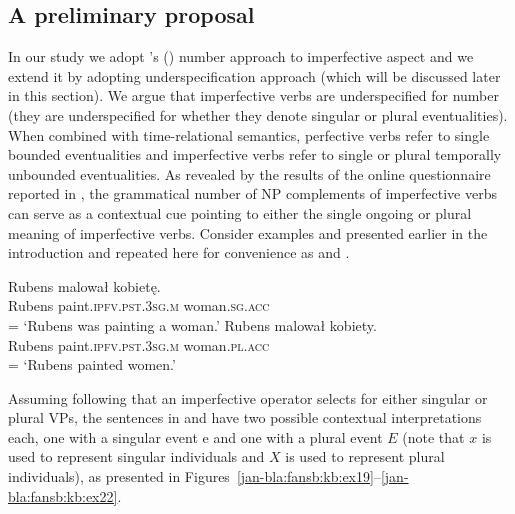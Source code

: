 \documentclass[output=paper]{langscibook}
\begin{document}
\subsection{A preliminary proposal}\label{jan-bla:fansb:kb:sec4.3}

In our study we adopt \citeauthor{Ferreira2004}'s (\citeyear{Ferreira2004, Ferreira2005}) number approach to imperfective aspect and we extend it by adopting  underspecification approach (which will be discussed later in this section). We argue that imperfective verbs are underspecified for number (they are underspecified for whether they denote singular or plural eventualities). When combined with time-relational semantics, perfective verbs refer to single bounded eventualities and imperfective verbs refer to single or plural temporally unbounded eventualities. As revealed by the results of the online questionnaire reported in , the grammatical number of NP complements of imperfective verbs can serve as a contextual cue pointing to either the single ongoing or plural meaning of imperfective verbs. Consider examples  and  presented earlier in the introduction and repeated here for convenience as  and . 

\ea
\gll Rubens malował kobietę.\\  
     Rubens paint.\textsc{ipfv}.\textsc{pst}.\textsc{3sg}.\textsc{m} woman.\textsc{sg}.\textsc{acc}\\\hfill = 
\glt ‘Rubens was painting a woman.’\label{jan-bla:fansb:kb:ex17}
\ex
\gll Rubens malował kobiety.\\  
     Rubens paint.\textsc{ipfv}.\textsc{pst}.\textsc{3sg}.\textsc{m} woman.\textsc{pl}.\textsc{acc}\\\hfill = 
\glt ‘Rubens painted women.’\label{jan-bla:fansb:kb:ex18}
\z

\noindent Assuming following \citet{Ferreira2004, Ferreira2005} that an imperfective operator selects for either singular or plural VPs, the sentences in  and  have two possible contextual interpretations each, one with a singular event e and one with a plural event $E$ (note that $x$ is used to represent singular individuals and $X$ is used to represent plural individuals), as presented in Figures~\ref{jan-bla:fansb:kb:ex19}--\ref{jan-bla:fansb:kb:ex22}.
\end{document}
